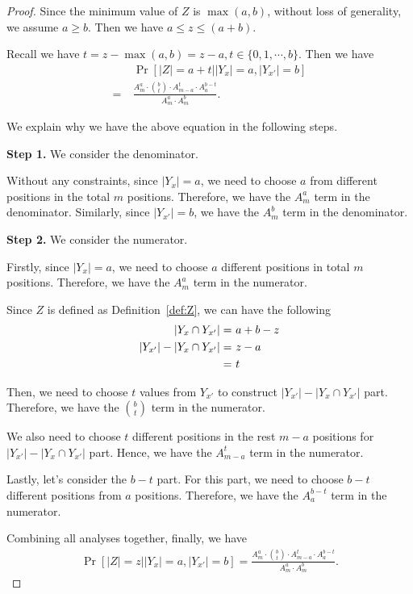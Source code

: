 \begin{proof}

Since the minimum value of $Z$ is $\max(a, b)$, without loss of generality, we assume $ a \geq b$. Then we have $a \leq z \leq (a + b)$.

Recall we have $t = z - \max(a, b) = z - a, t \in \{0, 1, \cdots , b\}$. Then we have
\begin{align*}
    & ~ \Pr[|Z| = a + t | |Y_x| = a, |Y_{x'}| = b] \\
    = & ~ \frac{A_m^a \cdot \binom{b}{t} \cdot A_{m - a}^t \cdot A_{a}^{b-t}}{A_m^a \cdot A_m^b}.
\end{align*}

We explain why we have the above equation in the following steps.

{\bf Step 1.} We consider the denominator. 

Without any constraints, since $|Y_x| = a$, we need to choose $a$ from different positions in the total $m$ positions. Therefore, we have the $A_m^a$ term in the denominator. Similarly, since $|Y_{x'}| = b$, we have the $A_m^b$ term in the denominator. 

{\bf Step 2.} We consider the numerator. 

Firstly, since $|Y_x| = a$, we need to choose $a$ different positions in total $m$ positions. Therefore, we have the $A_m^a$ term in the numerator. 

Since $Z$ is defined as Definition~\ref{def:Z}, we can have the following
\begin{align*}
    |Y_x \cap Y_{x'}| = & ~ a + b - z \notag \\
    |Y_{x'}| - |Y_x \cap Y_{x'}| = & ~ z - a \notag \\
    = & ~ t
\end{align*}

Then, we need to choose $t$ values from $Y_{x'}$ to construct $|Y_{x'}| - |Y_x \cap Y_{x'}|$ part. Therefore, we have the $\binom{b}{t}$ term in the numerator. 

We also need to choose $t$ different positions in the rest $m - a$ positions for  $|Y_{x'}| - |Y_x \cap Y_{x'}|$ part. Hence, we have the $A_{m - a} ^ t$ term in the numerator. 

Lastly, let's consider the $b - t$ part. For this part, we need to choose $b - t$ different positions from $a$ positions. Therefore, we have the $A_a^{b - t}$ term in the numerator. 

Combining all analyses together, finally, we have 
\begin{align*}
   \Pr[|Z| = z | |Y_x| = a, |Y_{x'}| = b] = \frac{A_m^a \cdot \binom{b}{t} \cdot A_{m - a}^t \cdot A_{a}^{b-t}}{A_m^a \cdot A_m^b}.
\end{align*}

\end{proof}

